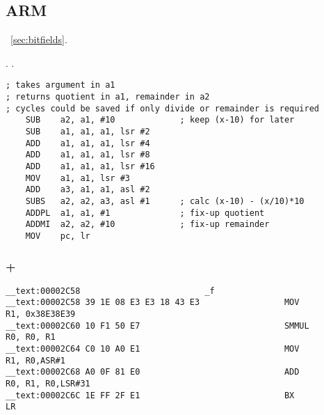 

\subsection{ARM}

~\ref{sec:bitfields}.

\cite[3.3 Division by a Constant]{ARM:1994}.
.

\begin{lstlisting}
; takes argument in a1
; returns quotient in a1, remainder in a2
; cycles could be saved if only divide or remainder is required
    SUB    a2, a1, #10             ; keep (x-10) for later
    SUB    a1, a1, a1, lsr #2
    ADD    a1, a1, a1, lsr #4
    ADD    a1, a1, a1, lsr #8
    ADD    a1, a1, a1, lsr #16
    MOV    a1, a1, lsr #3
    ADD    a3, a1, a1, asl #2
    SUBS   a2, a2, a3, asl #1      ; calc (x-10) - (x/10)*10
    ADDPL  a1, a1, #1              ; fix-up quotient
    ADDMI  a2, a2, #10             ; fix-up remainder
    MOV    pc, lr
\end{lstlisting}

\subsubsection{\OptimizingXcode + \ARMMode}

\begin{lstlisting}
__text:00002C58                         _f
__text:00002C58 39 1E 08 E3 E3 18 43 E3                 MOV             R1, 0x38E38E39
__text:00002C60 10 F1 50 E7                             SMMUL           R0, R0, R1
__text:00002C64 C0 10 A0 E1                             MOV             R1, R0,ASR#1
__text:00002C68 A0 0F 81 E0                             ADD             R0, R1, R0,LSR#31
__text:00002C6C 1E FF 2F E1                             BX              LR
\end{lstlisting}

